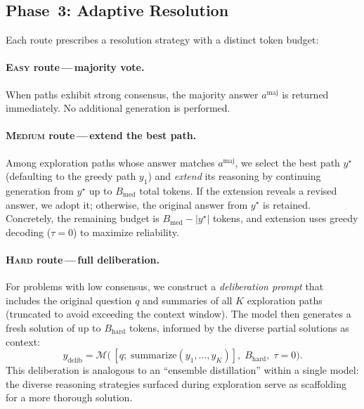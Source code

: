 \subsection{Phase~3: Adaptive Resolution}
\label{sec:method:resolve}

Each route prescribes a resolution strategy with a distinct token budget:

\paragraph{\textsc{Easy} route\,---\,majority vote.}
When paths exhibit strong consensus, the majority answer $a^{\mathrm{maj}}$
is returned immediately.
No additional generation is performed.

\paragraph{\textsc{Medium} route\,---\,extend the best path.}
Among exploration paths whose answer matches $a^{\mathrm{maj}}$, we select
the best path $y^{\star}$ (defaulting to the greedy path $y_1$) and
\emph{extend} its reasoning by continuing generation from $y^{\star}$ up to
$B_{\mathrm{med}}$ total tokens.
If the extension reveals a revised answer, we adopt it; otherwise, the
original answer from $y^{\star}$ is retained.
Concretely, the remaining budget is $B_{\mathrm{med}} - |y^{\star}|$
tokens, and extension uses greedy decoding ($\tau = 0$) to maximize
reliability.

\paragraph{\textsc{Hard} route\,---\,full deliberation.}
For problems with low consensus, we construct a \emph{deliberation prompt}
that includes the original question $q$ and summaries of all $K$ exploration
paths (truncated to avoid exceeding the context window).
The model then generates a fresh solution of up to $B_{\mathrm{hard}}$
tokens, informed by the diverse partial solutions as context:
\begin{equation}
  y_{\mathrm{delib}} = \mathcal{M}\!\big(\,
    [q;\; \mathrm{summarize}(y_1, \ldots, y_K)],\;
    B_{\mathrm{hard}},\; \tau = 0
  \big).
\end{equation}
This deliberation is analogous to an ``ensemble distillation'' within a
single model: the diverse reasoning strategies surfaced during exploration
serve as scaffolding for a more thorough solution.

